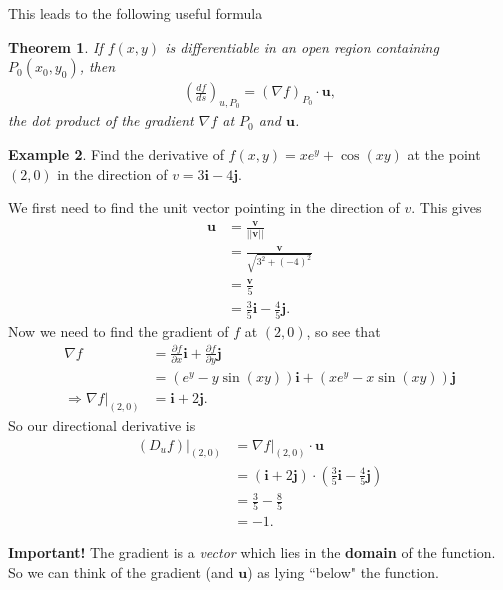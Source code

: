 \documentclass[12pt, letter]{article}
\theoremstyle{plain}
\newtheorem{theorem}{Theorem}
\numberwithin{theorem}{section}
\theoremstyle{definition}
\newtheorem{example}[theorem]{Example}
\begin{document}
\bigskip

This leads to the following useful formula

\bigskip

\begin{theorem}
If $f(x,y)$ is differentiable in an open region containing $P_0(x_0,y_0)$, then
\begin{align*}
\left( \frac{df}{ds} \right)_{u,P_0} = \left(\nabla f\right)_{P_0} \cdot \bm{u},
\end{align*}
the dot product of the gradient $\nabla f$ at $P_0$ and $\bm{u}$.
\end{theorem}

\bigskip

\hrulefill

\bigskip

\begin{example}
Find the derivative of $f(x,y) = xe^y + \cos(xy)$ at the point $(2,0)$ in the direction of $v=3\bm{i}-4\bm{j}$.

\smallskip

We first need to find the unit vector pointing in the direction of $v$. This gives
\begin{align*}
\bm{u} &= \frac{\bm{v}}{||\bm{v}||}\\
&= \frac{\bm{v}}{\sqrt{3^2+(-4)^2}}\\
&= \frac{\bm{v}}{5}\\
&= \frac{3}{5}\bm{i} - \frac{4}{5}\bm{j}.
\end{align*}
Now we need to find the gradient of $f$ at $(2,0)$, so see that
\begin{align*}
\nabla f& = \frac{\partial f}{\partial x} \bm{i} + \frac{\partial f}{\partial y} \bm{j}\\
&= (e^y-y\sin(xy))\bm{i} + (xe^y-x\sin(xy))\bm{j}\\
\Rightarrow \nabla f \rvert_{(2,0)} &= \bm{i} + 2\bm{j}.
\end{align*}
So our directional derivative is
\begin{align*}
(D_u f) \rvert_{(2,0)} &= \nabla f \rvert_{(2,0)} \cdot \bm{u}\\
&= \left( \bm{i}  + 2\bm{j} \right) \cdot \left(\frac{3}{5}\bm{i} - \frac{4}{5}\bm{j} \right)\\
&= \frac{3}{5} - \frac{8}{5}\\
&= -1.
\end{align*}
\end{example}

\bigskip

\textbf{Important!} The gradient is a \textit{vector} which lies in the \textbf{domain} of the function. So we can think of the gradient (and $\bm{u}$) as lying ``below" the function.
\end{document}
